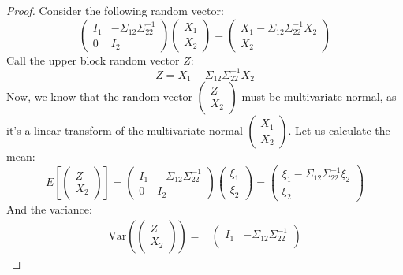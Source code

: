 \documentclass[12pt, a4paper]{article}
\numberwithin{equation}{section}
\begin{document}
\begin{proof}
Consider the following random vector:
\begin{equation}
\begin{pmatrix}
I_1 & -\Sigma_{12}\Sigma_{22}^{-1} \\
0   & I_2
\end{pmatrix}
\begin{pmatrix}
X_1 \\ X_2
\end{pmatrix}
=
\begin{pmatrix}
X_1-\Sigma_{12}\Sigma_{22}^{-1}X_2 \\ X_2
\end{pmatrix}
\end{equation}
Call the upper block random vector $Z$:
\begin{equation}
Z=X_1-\Sigma_{12}\Sigma_{22}^{-1}X_2
\end{equation}
Now, we know that the random vector $\begin{pmatrix}Z \\ X_2\end{pmatrix}$ must be multivariate normal, as it's a linear transform of the multivariate normal $\begin{pmatrix}X_1 \\ X_2\end{pmatrix}$. Let us calculate the mean:
\begin{equation}
E\left[\begin{pmatrix}Z \\ X_2\end{pmatrix}\right]=
\begin{pmatrix}
I_1 & -\Sigma_{12}\Sigma_{22}^{-1} \\
0   & I_2
\end{pmatrix}
\begin{pmatrix}\xi_1 \\ \xi_2\end{pmatrix}
=
\begin{pmatrix}
\xi_1-\Sigma_{12}\Sigma_{22}^{-1}\xi_2 \\ \xi_2
\end{pmatrix}
\end{equation}
And the variance:
\begin{align}
\textrm{Var}\left(\begin{pmatrix}Z \\ X_2\end{pmatrix}\right)=&
\begin{pmatrix}
I_1 & -\Sigma_{12}\Sigma_{22}^{-1} \\

\end{pmatrix}
\end{align}
\end{proof}
\end{document}
